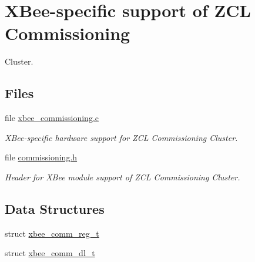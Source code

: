 \hypertarget{group__xbee__commissioning}{}\section{X\+Bee-\/specific support of Z\+CL Commissioning}
\label{group__xbee__commissioning}


Cluster.  


\subsection*{Files}
\begin{DoxyCompactItemize}
\item 
file \hyperlink{xbee__commissioning_8c}{xbee\+\_\+commissioning.\+c}
\begin{DoxyCompactList}\small\item\em X\+Bee-\/specific hardware support for Z\+CL Commissioning Cluster. \end{DoxyCompactList}\item 
file \hyperlink{commissioning_8h}{commissioning.\+h}
\begin{DoxyCompactList}\small\item\em Header for X\+Bee module support of Z\+CL Commissioning Cluster. \end{DoxyCompactList}\end{DoxyCompactItemize}
\subsection*{Data Structures}
\begin{DoxyCompactItemize}
\item 
struct \hyperlink{structxbee__comm__reg__t}{xbee\+\_\+comm\+\_\+reg\+\_\+t}
\item 
struct \hyperlink{structxbee__comm__dl__t}{xbee\+\_\+comm\+\_\+dl\+\_\+t}
\end{DoxyCompactItemize}
